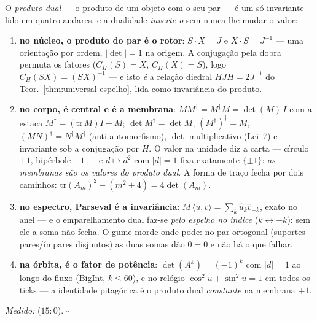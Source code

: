 \documentclass[livro.tex]{subfiles}
\begin{document}
\begin{teorema}\label{thm:produto-dual}
O \emph{produto dual} --- o produto de um objeto com o seu par --- \'e
um s\'o invariante lido em quatro andares, e a dualidade
\emph{inverte-o} sem nunca lhe mudar o valor:
\begin{enumerate}
\item \textbf{no n\'ucleo, o produto do par \'e o rotor}:
$S\cdot X=J$ e $X\cdot S=J^{-1}$ --- uma orienta\c{c}\~ao por ordem,
$|\det|=1$ na origem. A conjuga\c{c}\~ao pela dobra permuta os
fatores ($C_{H}(S)=X$, $C_{H}(X)=S$), logo
$C_{H}(S X)=(S X)^{-1}$ --- e isto \emph{\'e} a rela\c{c}\~ao diedral
$HJH=2J^{-1}$ do Teor.~\ref{thm:universal-espelho}, lida como
invari\^ancia do produto.
\item \textbf{no corpo, \'e central e \'e a membrana}:
$M M^{\dagger}=M^{\dagger}M=\det(M)\,I$ com a estaca
$M^{\dagger}=(\mathrm{tr}\,M)I-M$; $\det M^{\dagger}=\det M$,
$(M^{\dagger})^{\dagger}=M$, $(MN)^{\dagger}=N^{\dagger}M^{\dagger}$
(anti-automorfismo), $\det$ multiplicativo (Lei~7) e invariante sob a
conjuga\c{c}\~ao por $H$. O valor na unidade diz a carta --- c\'irculo
$+1$, hip\'erbole $-1$ --- e $d\mapsto d^{2}$ com $|d|=1$ fixa
exatamente $\{\pm1\}$: \emph{as membranas s\~ao os valores do produto
dual}. A forma de tra\c{c}o fecha por dois caminhos:
$\mathrm{tr}(A_{m})^{2}-(m^{2}+4)=4\det(A_{m})$.
\item \textbf{no espectro, Parseval \'e a invari\^ancia}:
$M\,\langle u,v\rangle=\sum_{k}\hat{u}_{k}\hat{v}_{-k}$, exato no
anel --- e o emparelhamento dual faz-se \emph{pelo espelho no
\'indice} ($k\leftrightarrow-k$): sem ele a soma n\~ao fecha. O gume
morde onde pode: no par ortogonal (suportes pares/\'impares
disjuntos) as duas somas d\~ao $0=0$ e n\~ao h\'a o que falhar.
\item \textbf{na \'orbita, \'e o fator de pot\^encia}:
$\det(A^{k})=(-1)^{k}$ com $|d|=1$ ao longo do fluxo (BigInt,
$k\le60$), e no rel\'ogio $\cos^{2}u+\sin^{2}u=1$ em todos os ticks
--- a identidade pitag\'orica \'e o produto dual \emph{constante} na
membrana $+1$.
\end{enumerate}
\emph{Medido:}  ($15{:}0$).
$\square$
\end{teorema}
\end{document}
